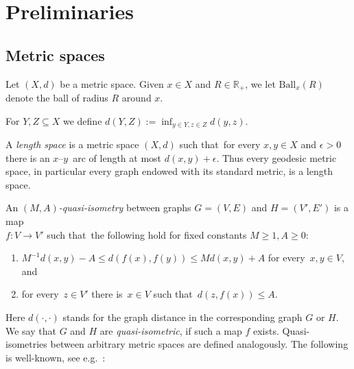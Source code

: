 \documentclass[a4paper]{article}
\newcommand{\comment}[1]{}
\newcommand{\defi}[1]{{\color{darkgray}\emph{#1}}}
\newtheorem{conjecture}{{Conjecture}}[section]
\newcommand{\N}{\ensuremath{\mathbb N}}
\newcommand{\R}{\ensuremath{\mathbb R}}
\newcommand{\Z}{\ensuremath{\mathbb Z}}
\newcommand{\pths}[2]{\ensuremath{#1}\text{--}\ensuremath{#2}~paths}
\newcommand{\g}{\ensuremath{G\ }}
\newcommand{\G}{\ensuremath{G}}
\newcommand{\fe}{for every}
\newcommand{\Fe}{For every}
\newcommand{\st}{such that}
\newcommand{\ti}{there is}
\newcommand{\ball}{\mathrm{Ball}}
\begin{document}
\comment{
\begin{conjecture} \label{conj MM NPc}
Fix $k\in \N$, and let \g be a graph on $n$ vertices, and   $A,Z$  two subsets of its vertex set. 

there is a constant $C_n$, \st\ the following holds \fe\ graph $G$  \Fe\ $r\in \Z$, either there is a set of $n$ \pths{A}{Z}\ in \g at distance at least  $r$ from each other, 
or there is a set $S$ of less than $n$ vertices of \G, \st\ removing the ball of radius $C_n r$ around $S$ separates $A$ from $Z$ in \G.
\end{conjecture}
}

\section{Preliminaries}



\subsection{Metric spaces} \label{sec MS}

Let $(X,d)$ be a metric space. Given $x\in X$ and $R\in \R_+$, we let $\ball_x(R)$ denote the ball of radius $R$ around $x$.

For $Y,Z\subseteq X$ we define $d(Y,Z):= \inf_{y\in Y, z\in Z} d(y,z)$.


A \defi{length space} is a metric space $(X,d)$ \st\ for every $x,y\in X$ and $\epsilon >0$ there is an $x$--$y$~arc of length at most $d(x,y)+\epsilon$. Thus every geodesic metric space, in particular every graph endowed with its standard metric, is a length space.


An  \defi{$(M,A)$-quasi-isometry} between graphs $G=(V,E)$ and $H=(V',E')$ is a map\\ $f: V \to V'$ \st\ the following hold for fixed constants $M\geq 1, A\geq 0$:
\begin{enumerate}
\item \label{q i} $M^{-1} d(x,y) -A \leq d(f(x),f(y))\leq M d(x,y) +A $ \fe\ $x,y \in V$, and
\item \label{q ii}  \fe\ $z\in V'$ \ti\ $x\in V$ \st\ $d(z,f(x))\leq A$.
\end{enumerate}
Here $d(\cdot,\cdot)$ stands for the graph distance in the corresponding graph $G$ or $H$. We say that $G$ and $H$ are \defi{quasi-isometric}, if such a map $f$ exists. Quasi-isometries between arbitrary metric spaces are defined analogously. The following is well-known, see e.g.\ {\cite[Proposition~3.B.7(6)]{cornulier_metric_2016}}:
\end{document}
